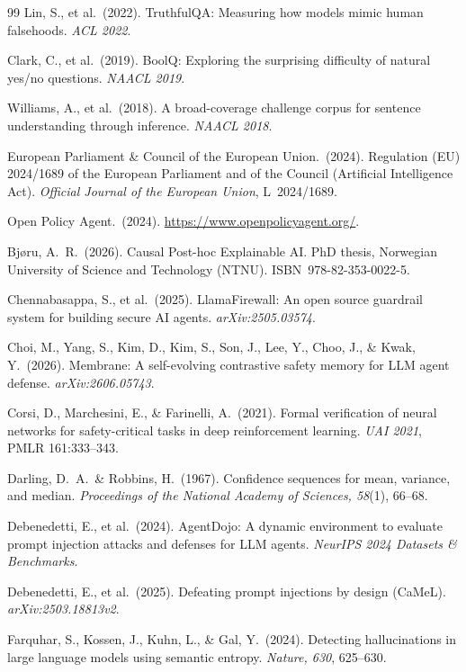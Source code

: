 \documentclass[10pt,twocolumn]{article}
\begin{document}
\begin{thebibliography}{99}
Lin, S., et al.\ (2022).
TruthfulQA: Measuring how models mimic human falsehoods.
\emph{ACL 2022}.

Clark, C., et al.\ (2019).
BoolQ: Exploring the surprising difficulty of natural yes/no questions.
\emph{NAACL 2019}.

Williams, A., et al.\ (2018).
A broad-coverage challenge corpus for sentence understanding through inference.
\emph{NAACL 2018}.

European Parliament \& Council of the European Union.\ (2024).
Regulation (EU) 2024/1689 of the European Parliament and of the Council
(Artificial Intelligence Act).
\emph{Official Journal of the European Union}, L~2024/1689.

Open Policy Agent.\ (2024).
\url{https://www.openpolicyagent.org/}.

Bjøru, A.~R.\ (2026).
Causal Post-hoc Explainable AI.
PhD thesis, Norwegian University of Science and Technology (NTNU).
ISBN~978-82-353-0022-5.

Chennabasappa, S., et al.\ (2025).
LlamaFirewall: An open source guardrail system for building secure AI agents.
\emph{arXiv:2505.03574}.

Choi, M., Yang, S., Kim, D., Kim, S., Son, J., Lee, Y., Choo, J.,
\& Kwak, Y.\ (2026).
Membrane: A self-evolving contrastive safety memory for LLM agent defense.
\emph{arXiv:2606.05743}.

Corsi, D., Marchesini, E., \& Farinelli, A.\ (2021).
Formal verification of neural networks for safety-critical tasks in deep
reinforcement learning.
\emph{UAI 2021}, PMLR 161:333--343.

Darling, D.~A.\ \& Robbins, H.\ (1967).
Confidence sequences for mean, variance, and median.
\emph{Proceedings of the National Academy of Sciences, 58}(1), 66--68.

Debenedetti, E., et al.\ (2024).
AgentDojo: A dynamic environment to evaluate prompt injection attacks and
defenses for LLM agents.
\emph{NeurIPS 2024 Datasets \& Benchmarks}.

Debenedetti, E., et al.\ (2025).
Defeating prompt injections by design (CaMeL).
\emph{arXiv:2503.18813v2}.

Farquhar, S., Kossen, J., Kuhn, L., \& Gal, Y.\ (2024).
Detecting hallucinations in large language models using semantic entropy.
\emph{Nature, 630}, 625--630.


\end{thebibliography}
\end{document}

